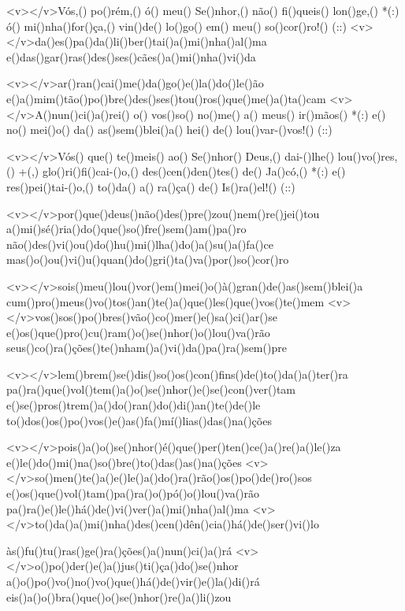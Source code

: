 <v></v>Vós,() po()rém,() ó() meu() Se()nhor,() não() fi()queis() lon()ge,() *(:)
ó() mi()nha()for()ça,() vin()de() lo()go() em() meu() so()cor()ro!() (::)
<v></v>da()es()pa()da()li()ber()tai()a()mi()nha()al()ma
e()das()gar()ras()des()ses()cães()a()mi()nha()vi()da

<v></v>ar()ran()cai()me()da()go()e()la()do()le()ão
e()a()mim()tão()po()bre()des()ses()tou()ros()que()me()a()ta()cam
<v></v>A()nun()ci()a()rei() o() vos()so() no()me() a() meus() ir()mãos() *(:)
e() no() mei()o() da() as()sem()blei()a() hei() de() lou()var-()vos!() (::)

<v></v>Vós() que() te()meis() ao() Se()nhor() Deus,() dai-()lhe() lou()vo()res,() +(,)
glo()ri()fi()cai-()o,() des()cen()den()tes() de() Ja()có,() *(:)
e() res()pei()tai-()o,() to()da() a() ra()ça() de() Is()ra()el!() (::)

<v></v>por()que()deus()não()des()pre()zou()nem()re()jei()tou
a()mi()sé()ria()do()que()so()fre()sem()am()pa()ro
não()des()vi()ou()do()hu()mi()lha()do()a()su()a()fa()ce
mas()o()ou()vi()u()quan()do()gri()ta()va()por()so()cor()ro

<v></v>sois()meu()lou()vor()em()mei()o()à()gran()de()as()sem()blei()a
cum()pro()meus()vo()tos()an()te()a()que()les()que()vos()te()mem
<v></v>vos()sos()po()bres()vão()co()mer()e()sa()ci()ar()se
e()os()que()pro()cu()ram()o()se()nhor()o()lou()va()rão
seus()co()ra()ções()te()nham()a()vi()da()pa()ra()sem()pre

<v></v>lem()brem()se()dis()so()os()con()fins()de()to()da()a()ter()ra
pa()ra()que()vol()tem()a()o()se()nhor()e()se()con()ver()tam
e()se()pros()trem()a()do()ran()do()di()an()te()de()le
to()dos()os()po()vos()e()as()fa()mí()lias()das()na()ções

<v></v>pois()a()o()se()nhor()é()que()per()ten()ce()a()re()a()le()za
e()le()do()mi()na()so()bre()to()das()as()na()ções
<v></v>so()men()te()a()e()le()a()do()ra()rão()os()po()de()ro()sos
e()os()que()vol()tam()pa()ra()o()pó()o()lou()va()rão
pa()ra()e()le()há()de()vi()ver()a()mi()nha()al()ma
<v></v>to()da()a()mi()nha()des()cen()dên()cia()há()de()ser()vi()lo

às()fu()tu()ras()ge()ra()ções()a()nun()ci()a()rá
<v></v>o()po()der()e()a()jus()ti()ça()do()se()nhor
a()o()po()vo()no()vo()que()há()de()vir()e()la()di()rá
eis()a()o()bra()que()o()se()nhor()re()a()li()zou